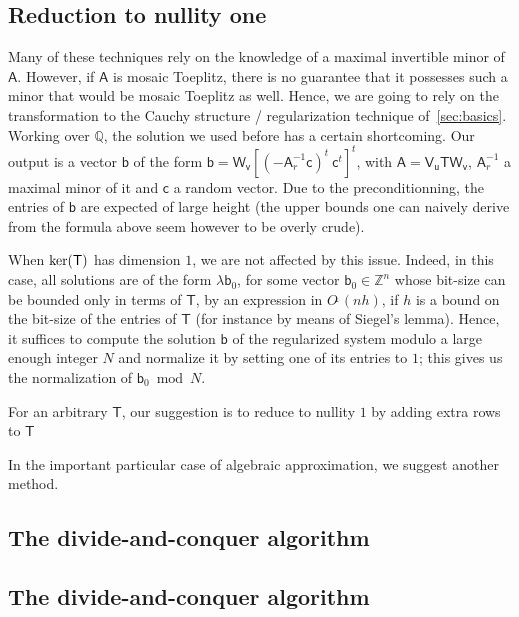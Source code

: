 \documentclass{sig-alternate}
\newcommand{\vb}{\ensuremath{\mathsf{b}}}
\newcommand{\vc}{\ensuremath{\mathsf{c}}}
\newcommand{\vu}{\ensuremath{\mathsf{u}}}
\newcommand{\vv}{\ensuremath{\mathsf{v}}}
\newcommand{\mA}{\ensuremath{\mathsf{A}}}
\newcommand{\mT}{\ensuremath{\mathsf{T}}}
\newcommand{\mV}{\ensuremath{\mathsf{V}}}
\newcommand{\mW}{\ensuremath{\mathsf{W}}}
\newcommand{\Q}{\ensuremath{\mathbb{Q}}}
\newcommand{\Z}{\ensuremath{\mathbb{Z}}}
\newcommand{\Otilde}[1]{\ensuremath{O\tilde{~}(#1)}} %
\begin{document}

\subsection{Reduction to nullity one}

Many of these techniques rely on the knowledge of a maximal invertible
minor of $\mA$. However, if $\mA$ is mosaic Toeplitz, there is no
guarantee that it possesses such a minor that would be mosaic Toeplitz
as well. Hence, we are going to rely on the transformation to the
Cauchy structure / regularization technique of~\ref{sec:basics}.
Working over $\Q$, the solution we used before has a certain
shortcoming. Our output is a vector $\vb$ of the form
$\vb=\mW_{\vv}[(-\mA_r^{-1}\vc)^t ~ \vc^t]^t$, with $\mA=\mV_\vu \mT
\mW_{\vv}$, $\mA_r^{-1}$ a maximal minor of it and $\vc$ a random
vector. Due to the preconditionning, the entries of $\vb$ are expected
of large height (the upper bounds one can naively derive from the
formula above seem however to be overly crude).

When ${\rm ker}(\mT)$ has dimension $1$, we are not affected by this
issue. Indeed, in this case, all solutions are of the form $\lambda
\vb_0$, for some vector $\vb_0 \in \Z^n$ whose bit-size can be bounded
only in terms of $\mT$, by an expression in $\Otilde{n h}$, if $h$ is
a bound on the bit-size of the entries of $\mT$ (for instance by means 
of Siegel's lemma). Hence, it suffices to compute the solution $\vb$ 
of the regularized system modulo a large enough integer $N$
and normalize it by setting one of its entries to $1$;
this gives us the normalization of $\vb_0 \bmod N$.

For an arbitrary $\mT$, our suggestion is to reduce to 
nullity $1$ by adding extra rows to $\mT$

In the important particular case of algebraic approximation,
we suggest another method.


\subsection{The divide-and-conquer algorithm}


\subsection{The divide-and-conquer algorithm}





 {\scriptsize }
\end{document}
